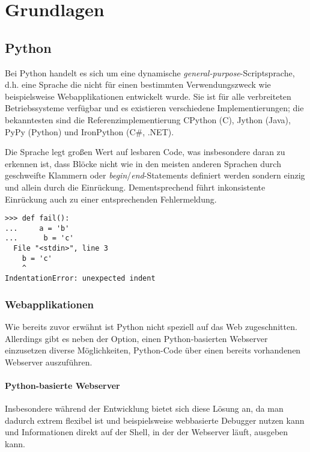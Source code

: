\chapter{Grundlagen}

\section{Python}

Bei Python handelt es sich um eine dynamische \emph{general-purpose}-Scriptsprache, d.h. eine Sprache
die nicht für einen bestimmten Verwendungszweck wie beispielsweise Webapplikationen entwickelt
wurde. Sie ist für alle verbreiteten Betriebssysteme verfügbar und es existieren verschiedene
Implementierungen; die bekanntesten sind die Referenzimplementierung CPython (C), Jython (Java),
PyPy (Python) und IronPython (C\#, .NET).

Die Sprache legt großen Wert auf lesbaren Code, was insbesondere daran zu erkennen ist, dass Blöcke
nicht wie in den meisten anderen Sprachen durch geschweifte Klammern oder
\emph{begin}/\emph{end}-Statements definiert werden sondern einzig und allein durch die Einrückung.
Dementsprechend führt inkonsistente Einrückung auch zu einer entsprechenden Fehlermeldung.

\begin{lstlisting}[caption=Fehlerhafte Einrückung]
>>> def fail():
...     a = 'b'
...      b = 'c'
  File "<stdin>", line 3
    b = 'c'
    ^
IndentationError: unexpected indent
\end{lstlisting}


\subsection{Webapplikationen}

Wie bereits zuvor erwähnt ist Python nicht speziell auf das Web zugeschnitten. Allerdings gibt es
neben der Option, einen Python-basierten Webserver einzusetzen diverse Möglichkeiten, Python-Code
über einen bereits vorhandenen Webserver auszuführen.

\subsubsection{Python-basierte Webserver}

Insbesondere während der Entwicklung bietet sich diese Lösung an, da man dadurch extrem flexibel
ist und beispielsweise webbasierte Debugger nutzen kann und Informationen direkt auf der Shell, in
der der Webserver läuft, ausgeben kann.

